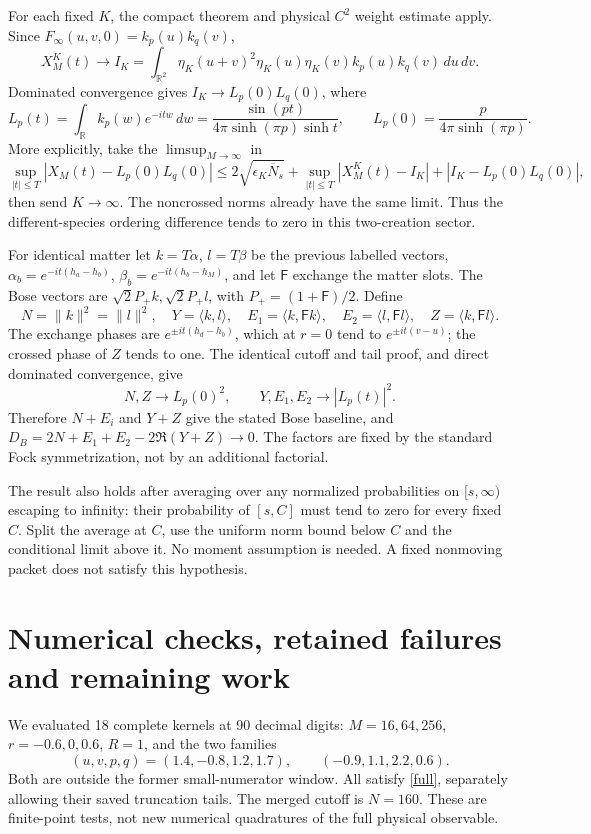 \documentclass[11pt,a4paper]{article}
\begin{document}
For each fixed $K$, the compact theorem and physical $C^2$ weight
estimate apply. Since $F_\infty(u,v,0)=k_p(u)k_q(v)$,
\[
 X_M^K(t)\longrightarrow
 I_K=\int_{\mathbb R^2}\eta_K(u+v)^2\eta_K(u)\eta_K(v)
                 k_p(u)k_q(v)\,du\,dv .
\]
Dominated convergence gives $I_K\to L_p(0)L_q(0)$, where
\begin{equation}
 L_p(t)=\int_{\mathbb R}k_p(w)e^{-itw}\,dw
       =\frac{\sin(pt)}{4\pi\sinh(\pi p)\sinh t},\qquad
 L_p(0)=\frac{p}{4\pi\sinh(\pi p)}.
 \label{L}
\end{equation}
More explicitly, take the $\limsup_{M\to\infty}$ in
\[
 \sup_{|t|\le T}|X_M(t)-L_p(0)L_q(0)|
 \le2\sqrt{\epsilon_K\overline N_s}
   +\sup_{|t|\le T}|X_M^K(t)-I_K|
   +|I_K-L_p(0)L_q(0)|,
\]
then send $K\to\infty$.
The noncrossed norms already have the same limit.
Thus the different-species ordering difference tends to zero in this
two-creation sector.

For identical matter let $k=T\alpha$, $l=T\beta$ be the previous
labelled vectors, $\alpha_b=e^{-it(h_a-h_b)}$,
$\beta_b=e^{-it(h_b-h_M)}$, and let $\mathsf F$ exchange the matter slots.
The Bose vectors are $\sqrt2P_+k,\sqrt2P_+l$, with
$P_+=(1+\mathsf F)/2$. Define
\[
 N=\|k\|^2=\|l\|^2,\quad Y=\langle k,l\rangle,\quad
 E_1=\langle k,\mathsf Fk\rangle,\quad
 E_2=\langle l,\mathsf Fl\rangle,\quad Z=\langle k,\mathsf Fl\rangle .
\]
The exchange phases are $e^{\pm it(h_d-h_b)}$, which at $r=0$
tend to $e^{\pm it(v-u)}$; the crossed phase of $Z$ tends to one.
The identical cutoff and tail proof, and direct dominated convergence,
give
\[
 N,Z\to L_p(0)^2,\qquad Y,E_1,E_2\to |L_p(t)|^2.
\]
Therefore $N+E_i$ and $Y+Z$ give the stated Bose baseline, and
$D_B=2N+E_1+E_2-2\Re(Y+Z)\to0$. The factors are fixed by the standard
Fock symmetrization, not by an additional factorial.

The result also holds after averaging over any normalized probabilities
on $[s,\infty)$ escaping to infinity: their probability of $[s,C]$
must tend to zero for every fixed $C$. Split the average at $C$, use
the uniform norm bound below $C$ and the conditional limit above it.
No moment assumption is needed. A fixed nonmoving packet does not
satisfy this hypothesis.

\newpage
\section{Numerical checks, retained failures and remaining work}
We evaluated 18 complete kernels at 90 decimal digits:
$M=16,64,256$, $r=-0.6,0,0.6$, $R=1$, and the two families
\[
 (u,v,p,q)=(1.4,-0.8,1.2,1.7),\qquad(-0.9,1.1,2.2,0.6).
\]
Both are outside the former small-numerator window.
All satisfy \eqref{full}, separately allowing their saved truncation
tails. The merged cutoff is $N=160$. These are finite-point tests,
not new numerical quadratures of the full physical observable.
\end{document}
